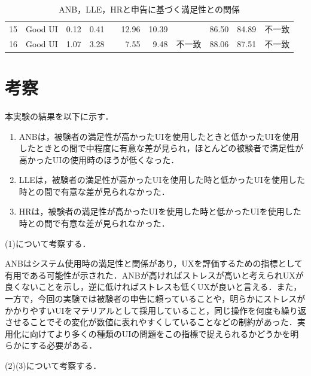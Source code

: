\begin{landscape}
\begin{table}[htbp]
\begin{tabular}{llrrlrrlrrl}
15                      & Good UI                & 0.12                     & 0.41                     &                        & 12.96                    & 10.39                    &                        & 86.50                    & 84.89                    & 不一致                    \\
16                      & Good UI                & 1.07                     & 3.28                     &                        & 7.55                     & 9.48                     & 不一致                    & 88.06                    & 87.51                    & 不一致                    \\ \hline
\end{tabular}
\label{table:result1-2}
\caption{ANB，LLE，HRと申告に基づく満足性との関係}
\end{table}
\end{landscape}

\section{考察}

本実験の結果を以下に示す．

\begin{enumerate}
\renewcommand{\labelenumi}{(\arabic{enumi})}
  \item ANBは，被験者の満足性が高かったUIを使用したときと低かったUIを使用したときとの間で中程度\cite{cohen}に有意な差が見られ，ほとんどの被験者で満足性が高かったUIの使用時のほうが低くなった．
  \item LLEは，被験者の満足性が高かったUIを使用した時と低かったUIを使用した時との間で有意な差が見られなかった．
  \item HRは，被験者の満足性が高かったUIを使用した時と低かったUIを使用した時との間で有意な差が見られなかった．
\end{enumerate}

(1)について考察する．

ANBはシステム使用時の満足性と関係があり，UXを評価するための指標として有用である可能性が示された．ANBが高ければストレスが高いと考えられUXが良くないことを示し，逆に低ければストレスも低くUXが良いと言える．また，一方で，今回の実験では被験者の申告に頼っていることや，明らかにストレスがかかりやすいUIをマテリアルとして採用していること，同じ操作を何度も繰り返させることでその変化が数値に表れやすくしていることなどの制約があった．実用化に向けてより多くの種類のUIの問題をこの指標で捉えられるかどうかを明らかにする必要がある．

(2)(3)について考察する．

